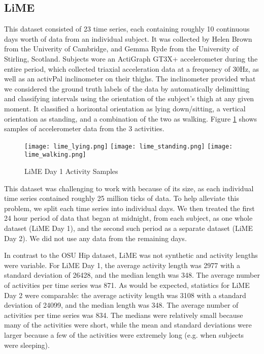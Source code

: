 \subsection{LiME}
This dataset consisted of 23 time series, each containing roughly 10 continuous
days worth of data from an individual subject. It was collected by Helen Brown from
the Univerity of Cambridge, and Gemma Ryde from the University of Stirling, Scotland.
Subjects wore an ActiGraph GT3X+
accelerometer during the entire period, which collected triaxial acceleration data at a frequency
of 30Hz, as well as an activPal inclinometer on their thighs. The inclinometer
provided what we considered the ground truth labels of the data by automatically
delimitting and classifying intervals using the orientation of the subject's thigh at any given moment. It 
classified a horizontal orientation as lying down/sitting,
a vertical orientation as standing, and a combination of the two as walking. Figure
\ref{fig:lime_activities} shows samples of accelerometer data from the 3 activities.

\begin{figure}
 \centering
 \texttt{[image: lime\_lying.png]}
 \texttt{[image: lime\_standing.png]}
 \texttt{[image: lime\_walking.png]}
 \caption{LiME Day 1 Activity Samples}
 \label{fig:lime_activities}
\end{figure}

This dataset was challenging to work with because of its size, as each individual time series
contained roughly 25 million ticks of data. To help alleviate this problem, we split each
time series into individual days. We then treated the first 24 hour period of data that began at midnight,
from each subject, as one whole dataset (LiME Day 1), and the second such period as a separate dataset
(LiME Day 2). We did not use any data from the remaining days.

In contrast to the OSU Hip dataset, LiME
was not synthetic and activity lengths were variable. For LiME Day 1, the
average activity length was 2977 with a standard deviation of 26428, and the
median length was 348. The average number of activities per time series was
871. As would be expected, statistics for LiME Day 2 were comparable: the
average activity length was 3108 with a standard deviation of 24099, and the
median length was 348. The average number of activities per time series was 834.
The medians were relatively small because many of the activities were short,
while the mean and standard deviations were larger because a few of the
activities were extremely long (e.g. when subjects were sleeping).

